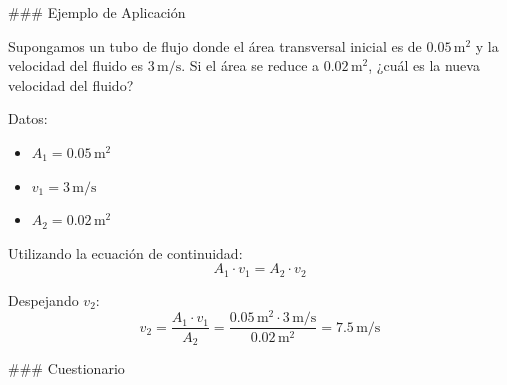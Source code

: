 \documentclass[../main]{subfiles}
\begin{document}
### Ejemplo de Aplicación

Supongamos un tubo de flujo donde el área transversal inicial es de $0.05 \, \text{m}^2$ y la velocidad del fluido es $3 \, \text{m/s}$. Si el área se reduce a $0.02 \, \text{m}^2$, ¿cuál es la nueva velocidad del fluido?

Datos:
\begin{itemize}
    \item $A_1 = 0.05 \, \text{m}^2$
    \item $v_1 = 3 \, \text{m/s}$
    \item $A_2 = 0.02 \, \text{m}^2$
\end{itemize}

Utilizando la ecuación de continuidad:
\begin{equation}
A_1 \cdot v_1 = A_2 \cdot v_2
\end{equation}

Despejando $v_2$:
\begin{equation}
v_2 = \frac{A_1 \cdot v_1}{A_2} = \frac{0.05 \, \text{m}^2 \cdot 3 \, \text{m/s}}{0.02 \, \text{m}^2} = 7.5 \, \text{m/s}
\end{equation}

### Cuestionario
\end{document}
